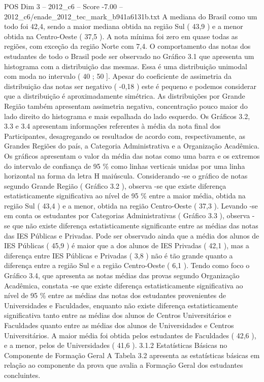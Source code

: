 \begin{textsample}{POS Dim 3 – 2012\_c6 – Score -7.00 – 2012\_c6/enade\_2012\_tec\_mark\_b941a6131b.txt}
A mediana do Brasil como um todo foi 42,4, sendo a maior mediana obtida na região Sul ( 43,9 ) e a menor obtida na Centro-Oeste ( 37,5 ).
A nota mínima foi zero em quase todas as regiões, com exceção da região Norte com 7,4.
O comportamento das notas dos estudantes de todo o Brasil pode ser observado no Gráfico 3.1 que apresenta um histograma com a distribuição das mesmas.
Essa é uma distribuição unimodal com moda no intervalo ( 40 ; 50 ].
Apesar do coeficiente de assimetria da distribuição das notas ser negativo ( -0,18 ) este é pequeno e podemos considerar que a distribuição é aproximadamente simétrica.
As distribuições por Grande Região também apresentam assimetria negativa, concentração pouco maior do lado direito do histograma e mais espalhada do lado esquerdo.
Os Gráficos 3.2, 3.3 e 3.4 apresentam informações referentes à média da nota final dos Participantes, desagregando os resultados de acordo com, respectivamente, as Grandes Regiões do país, a Categoria Administrativa e a Organização Acadêmica.
Os gráficos apresentam o valor da média das notas como uma barra e os extremos do intervalo de confiança de 95 \% como linhas verticais unidas por uma linha horizontal na forma da letra H maiúscula.
Considerando -se o gráfico de notas segundo Grande Região ( Gráfico 3.2 ), observa -se que existe diferença estatisticamente significativa ao nível de 95 \% entre a maior média, obtida na região Sul ( 43,4 ) e a menor, obtida na região Centro-Oeste ( 37,3 ).
Levando -se em conta os estudantes por Categorias Administrativas ( Gráfico 3.3 ), observa -se que não existe diferença estatisticamente significante entre as médias das notas das IES Públicas e Privadas.
Pode ser observado ainda que a média dos alunos de IES Públicas ( 45,9 ) é maior que a dos alunos de IES Privadas ( 42,1 ), mas a diferença entre IES Públicas e Privadas ( 3,8 ) não é tão grande quanto a diferença entre a região Sul e a região Centro-Oeste ( 6,1 ).
Tendo como foco o Gráfico 3.4, que apresenta as notas médias das provas segundo Organização Acadêmica, constata -se que existe diferença estatisticamente significativa ao nível de 95 \% entre as médias das notas dos estudantes provenientes de Universidades e Faculdades, enquanto não existe diferença estatisticamente significativa tanto entre as médias dos alunos de Centros Universitários e Faculdades quanto entre as médias dos alunos de Universidades e Centros Universitários.
A maior média foi obtida pelos estudantes de Faculdades ( 42,6 ), e a menor, pelos de Universidades ( 41,6 ). 3.1.2 Estatísticas Básicas no Componente de Formação Geral A Tabela 3.2 apresenta as estatísticas básicas em relação ao componente da prova que avalia a Formação Geral dos estudantes concluintes.

\end{textsample}
